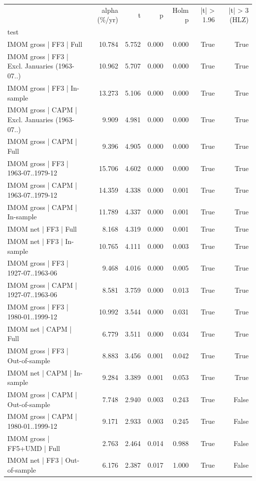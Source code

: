 \begin{tabular}{lrrrrrr}
\toprule
 & alpha (\%/yr) & t & p & Holm p & |t| > 1.96 & |t| > 3 (HLZ) \\
test &  &  &  &  &  &  \\
\midrule
IMOM gross | FF3 | Full & 10.784 & 5.752 & 0.000 & 0.000 & True & True \\
IMOM gross | FF3 | Excl. Januaries (1963-07..) & 10.962 & 5.707 & 0.000 & 0.000 & True & True \\
IMOM gross | FF3 | In-sample & 13.273 & 5.106 & 0.000 & 0.000 & True & True \\
IMOM gross | CAPM | Excl. Januaries (1963-07..) & 9.909 & 4.981 & 0.000 & 0.000 & True & True \\
IMOM gross | CAPM | Full & 9.396 & 4.905 & 0.000 & 0.000 & True & True \\
IMOM gross | FF3 | 1963-07..1979-12 & 15.706 & 4.602 & 0.000 & 0.000 & True & True \\
IMOM gross | CAPM | 1963-07..1979-12 & 14.359 & 4.338 & 0.000 & 0.001 & True & True \\
IMOM gross | CAPM | In-sample & 11.789 & 4.337 & 0.000 & 0.001 & True & True \\
IMOM net | FF3 | Full & 8.168 & 4.319 & 0.000 & 0.001 & True & True \\
IMOM net | FF3 | In-sample & 10.765 & 4.111 & 0.000 & 0.003 & True & True \\
IMOM gross | FF3 | 1927-07..1963-06 & 9.468 & 4.016 & 0.000 & 0.005 & True & True \\
IMOM gross | CAPM | 1927-07..1963-06 & 8.581 & 3.759 & 0.000 & 0.013 & True & True \\
IMOM gross | FF3 | 1980-01..1999-12 & 10.992 & 3.544 & 0.000 & 0.031 & True & True \\
IMOM net | CAPM | Full & 6.779 & 3.511 & 0.000 & 0.034 & True & True \\
IMOM gross | FF3 | Out-of-sample & 8.883 & 3.456 & 0.001 & 0.042 & True & True \\
IMOM net | CAPM | In-sample & 9.284 & 3.389 & 0.001 & 0.053 & True & True \\
IMOM gross | CAPM | Out-of-sample & 7.748 & 2.940 & 0.003 & 0.243 & True & False \\
IMOM gross | CAPM | 1980-01..1999-12 & 9.171 & 2.933 & 0.003 & 0.245 & True & False \\
IMOM gross | FF5+UMD | Full & 2.763 & 2.464 & 0.014 & 0.988 & True & False \\
IMOM net | FF3 | Out-of-sample & 6.176 & 2.387 & 0.017 & 1.000 & True & False \\

\end{tabular}
